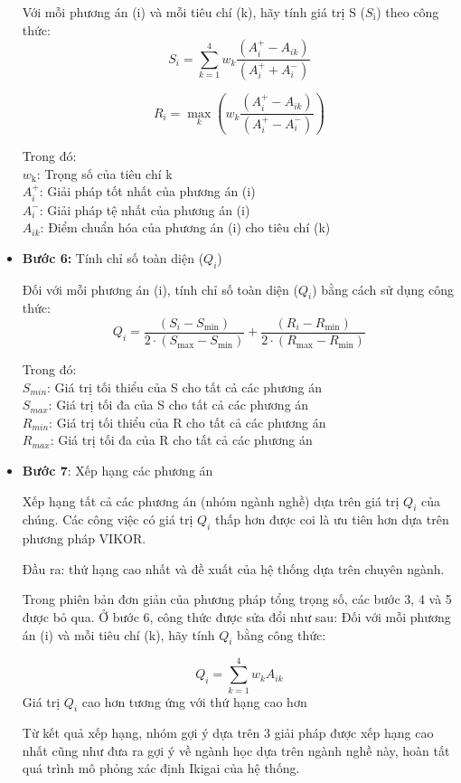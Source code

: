 \begin{itemize}
    Với mỗi phương án (i) và mỗi tiêu chí (k), hãy tính giá trị S ($S_{\text{i}}$) theo công thức:\\
    \[
S_i = \sum_{k=1}^{4} w_k \frac{{(A^{+}_i - A_{ik})}}{{(A^{+}_i + A^{-}_i)}}
\]

    \[
R_i = \max_{k} \left( w_k \frac{{(A^{+}_i - A_{ik})}}{{(A^{+}_i - A^{-}_i)}} \right)
\]

    Trong đó:\\
    $w_{\text{k}}$: Trọng số của tiêu chí k\\
    $A^{+}_i$: Giải pháp tốt nhất của phương án (i)\\
    $A^{-}_i$: Giải pháp tệ nhất của phương án (i)\\
    $A_{ik}$: Điểm chuẩn hóa của phương án (i) cho tiêu chí (k)

    \item \textbf{Bước 6:} Tính chỉ số toàn diện ($Q_{i}$)
    
    Đối với mỗi phương án (i), tính chỉ số toàn diện ($Q_{i}$) bằng cách sử dụng công thức:
    \[
        Q_i = \frac{{(S_i - S_{\text{min}})}}{{2 \cdot (S_{\text{max}} - S_{\text{min}})}} + \frac{{(R_i - R_{\text{min}})}}{{2 \cdot (R_{\text{max}} - R_{\text{min}})}}
    \]

    Trong đó: \\
    $S_{min}$: Giá trị tối thiểu của S cho tất cả các phương án \\
    $S_{max}$: Giá trị tối đa của S cho tất cả các phương án \\
    $R_{min}$: Giá trị tối thiểu của R cho tất cả các phương án \\
    $R_{max}$: Giá trị tối đa của R cho tất cả các phương án \\

    \item \textbf{Bước 7}: Xếp hạng các phương án

    Xếp hạng tất cả các phương án (nhóm ngành nghề) dựa trên giá trị $Q_i$ của chúng. Các công việc có giá trị $Q_i$ thấp hơn được coi là ưu tiên hơn dựa trên phương pháp VIKOR.
    
    Đầu ra: thứ hạng cao nhất và đề xuất của hệ thống dựa trên chuyên ngành.
    
    Trong phiên bản đơn giản của phương pháp tổng trọng số, các bước 3, 4 và 5 được bỏ qua. Ở bước 6, công thức được sửa đổi như sau:
    Đối với mỗi phương án (i) và mỗi tiêu chí (k), hãy tính $Q_i$ bằng công thức:
    
    \[
Q_i = \sum_{k=1}^{4} w_k A_{ik}
\]
    Giá trị $Q_i$ cao hơn tương ứng với thứ hạng cao hơn
    
    Từ kết quả xếp hạng, nhóm gợi ý dựa trên 3 giải pháp được xếp hạng cao nhất cũng như đưa ra gợi ý về ngành học dựa trên ngành nghề này, hoàn tất quá trình mô phỏng xác định Ikigai của hệ thống.
\end{itemize}


